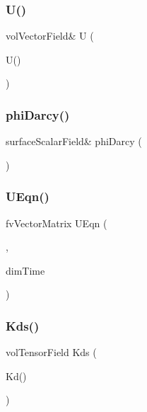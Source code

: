 \subsubsection{\texorpdfstring{U()}{U()}}
{\footnotesize\ttfamily vol\+Vector\+Field\& U (\begin{DoxyParamCaption}\item[{fluid\+\_\+.}]{U() }\end{DoxyParamCaption})}

\mbox{\label{UEqn__1pl_8H_a8d8b81e7b9e1aacc2219b33e188bbe8b}} 
\subsubsection{\texorpdfstring{phi\+Darcy()}{phiDarcy()}}
{\footnotesize\ttfamily surface\+Scalar\+Field\& phi\+Darcy (\begin{DoxyParamCaption}\item[{phi\+Darcy\+\_\+()}]{ }\end{DoxyParamCaption})}

\mbox{\label{UEqn__1pl_8H_afd1b8693a3c3032de396035e7045d467}} 
\subsubsection{\texorpdfstring{U\+Eqn()}{UEqn()}}
{\footnotesize\ttfamily fv\+Vector\+Matrix U\+Eqn (\begin{DoxyParamCaption}\item[{\hyperlink{UEqn__1pl_8H_a128902f421bd168fd4996f177e0a59ad}{U\+Darcy}}]{,  }\item[{dim\+Mass $\ast$dim\+Length/dim\+Time/}]{dim\+Time }\end{DoxyParamCaption})}

\mbox{\label{UEqn__1pl_8H_a62892add15b2471396e4cbe00bd27b51}} 
\subsubsection{\texorpdfstring{Kds()}{Kds()}}
{\footnotesize\ttfamily vol\+Tensor\+Field Kds (\begin{DoxyParamCaption}\item[{F\+S\+Pair\+\_\+.}]{Kd() }\end{DoxyParamCaption})}

